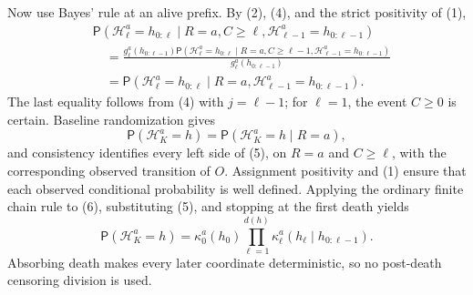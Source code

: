 Now use Bayes' rule at an alive prefix.  By (2), (4), and the strict positivity of (1),
\[
\begin{aligned}
 &\mathsf P(\mathcal H_\ell^a=h_{0:\ell}
      \mid R=a,C\ge\ell,\mathcal H_{\ell-1}^a=h_{0:\ell-1})\\
 &\quad=
 \frac{g_\ell^a(h_{0:\ell-1})
       \mathsf P(\mathcal H_\ell^a=h_{0:\ell}
          \mid R=a,C\ge\ell-1,
                 \mathcal H_{\ell-1}^a=h_{0:\ell-1})}
      {g_\ell^a(h_{0:\ell-1})}\\
 &\quad=
 \mathsf P(\mathcal H_\ell^a=h_{0:\ell}
      \mid R=a,\mathcal H_{\ell-1}^a=h_{0:\ell-1}).
\end{aligned}                                             \tag{5}
\]
The last equality follows from (4) with \(j=\ell-1\); for \(\ell=1\), the event \(C\ge0\) is certain.  Baseline randomization gives
\[
 \mathsf P(\mathcal H_K^a=h)=
 \mathsf P(\mathcal H_K^a=h\mid R=a),                      \tag{6}
\]
and consistency identifies every left side of (5), on \(R=a\) and \(C\ge\ell\), with the corresponding observed transition of \(O\).  Assignment positivity and (1) ensure that each observed conditional probability is well defined.  Applying the ordinary finite chain rule to (6), substituting (5), and stopping at the first death yields
\[
 \mathsf P(\mathcal H_K^a=h)
 =\kappa_0^a(h_0)
   \prod_{\ell=1}^{d(h)}
       \kappa_\ell^a(h_\ell\mid h_{0:\ell-1}).            \tag{7}
\]
Absorbing death makes every later coordinate deterministic, so no post-death censoring division is used.

